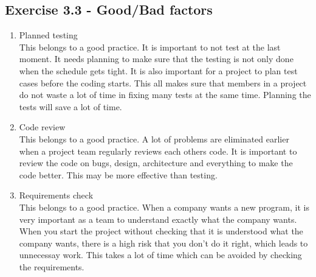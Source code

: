 \subsection{Exercise 3.3 - Good/Bad factors}
\begin{enumerate}
\item Planned testing \hfill \\
This belongs to a good practice. It is important to not test at the last moment. It needs planning to make sure that the testing is not only done when the schedule gets tight. It is also important for a project to plan test cases before the coding starts. This all makes sure that members in a project do not waste a lot of time in fixing many tests at the same time. Planning the tests will save a lot of time.
\item Code review \hfill \\
This belongs to a good practice. A lot of problems are eliminated earlier when a project team regularly reviews each others code. It is important to review the code on bugs, design, architecture and everything to make the code better. This may be more effective than testing.
\item Requirements check \hfill \\
This belongs to a good practice. When a company wants a new program, it is very important as a team to understand exactly what the company wants. When you start the project without checking that it is understood what the company wants, there is a high risk that you don't do it right, which leads to unnecessay work. This takes a lot of time which can be avoided by checking the requirements.
\end{enumerate}
\newpage
